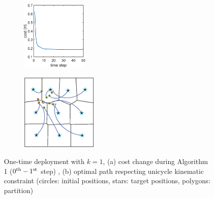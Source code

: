 \documentclass[letterpaper, 10 pt, conference]{ieeeconf}
\begin{document}
\begin{figure}
	\centering
	 \begin{subfigure}[b]{0.22\textwidth}
	\centering
	\includegraphics[width=1.3in]{figure/init_10_deploy_cmd2}
	\caption{}
	\end{subfigure}	
	 \begin{subfigure}[b]{0.22\textwidth}
	\centering
	\includegraphics[width=1.5in]{figure/init_10_deploy_cmd1}
	\caption{}
\end{subfigure}	
	\caption{One-time deployment with $k=1$, (a) cost change during Algorithm 1 ($0^{\textup{th}}-1^{\textup{st}}$ step) , (b) optimal path respecting unicycle kinematic constraint (circles: initial positions, stars: target positions, polygons: partition)}
	\label{fig:fig2}
\end{figure}
\end{document}
